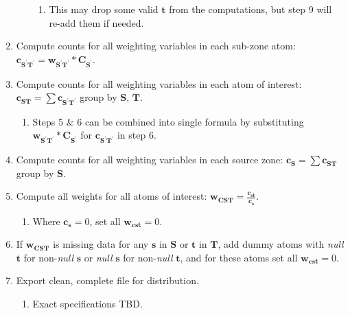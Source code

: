 \documentclass{article}
\begin{document}
\begin{enumerate}
\begin{enumerate}
      \begin{enumerate}
      \item This may drop some valid $\bm{t}$ from the computations, but step 9 will re-add them if needed.
      \end{enumerate}
   \end{enumerate}
\item Compute counts for all weighting variables in each sub-zone atom: $\mathbf{c_{\mathbf{S^\prime T^\prime}}} = \mathbf{w_{\mathbf{S^\prime T^\prime}}} * \mathbf{C_{\mathbf{S^\prime}}}$.
\item Compute counts for all weighting variables in each atom of interest: $\mathbf{c_{\mathbf{ST}}} = \sum \mathbf{c_{\mathbf{S^\prime T^\prime}}}$ group by $\mathbf{S}$, $\mathbf{T}$.
  \begin{enumerate}
  \item Steps 5 \& 6 can be combined into single formula by substituting $\mathbf{w_{\mathbf{S^\prime T^\prime}}} * \mathbf{C_{\mathbf{S^\prime}}}$ for $\mathbf{c_{\mathbf{S^\prime T^\prime}}}$ in step 6.
  \end{enumerate}
\item Compute counts for all weighting variables in each source zone: $\mathbf{c_{\mathbf{S}}} = \sum \mathbf{c_{\mathbf{ST}}}$ group by $\mathbf{S}$.
\item Compute all weights for all atoms of interest: $\mathbf{w_{\mathbf{CST}}} = \displaystyle \frac{\mathbf{c_{st}}}{\mathbf{c_{s}}}$.
  \begin{enumerate}
  \item Where $\bm{c_{s}} = 0$, set all $\bm{w_{\bm{cst}}} = 0$.
  \end{enumerate}
\item If $\mathbf{w_{\mathbf{CST}}}$ is missing data for any $\bm{s}$ in $\mathbf{S}$ or $\bm{t}$ in $\mathbf{T}$, add dummy atoms with \textit{null} $\bm{t}$ for non-\textit{null} $\bm{s}$ or \textit{null} $\bm{s}$ for non-\textit{null} $\bm{t}$, and for these atoms set all $\bm{w_{\bm{cst}}} = 0$.

\item Export clean, complete file for distribution.
  \begin{enumerate}
  \item Exact specifications TBD.
  \end{enumerate}
\end{enumerate}
\end{document}
